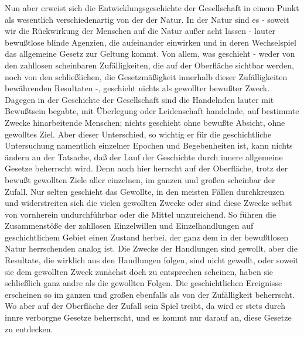 Nun aber erweist sich die Entwicklungsgeschichte der
Gesellschaft in einem Punkt als wesentlich verschiedenartig von der der
Natur. In der Natur sind es - soweit wir die Rückwirkung der Menschen
auf die Natur außer acht lassen - lauter bewußtlose blinde Agenzien, die
aufeinander einwirken und in deren Wechselspiel das allgemeine Gesetz
zur Geltung kommt. Von allem, was geschieht - weder von den zahllosen
scheinbaren Zufälligkeiten, die auf der Oberfläche sichtbar werden, noch
von den schließlichen, die Gesetzmäßigkeit innerhalb dieser
Zufälligkeiten bewährenden Resultaten -, geschieht nichts als gewollter
bewußter Zweck. Dagegen in der Geschichte der Gesellschaft sind die
Handelnden lauter mit Bewußtsein begabte, mit Überlegung oder
Leidenschaft handelnde, auf bestimmte Zwecke hinarbeitende Menschen;
nichts geschieht ohne bewußte Absicht, ohne gewolltes Ziel. Aber dieser
Unterschied, so wichtig er für die geschichtliche Untersuchung
namentlich einzelner Epochen und Begebenheiten ist, kann nichts ändern
an der Tatsache, daß der Lauf der Geschichte durch innere allgemeine
Gesetze beherrscht wird. Denn auch hier herrscht auf der Oberfläche,
trotz der bewußt gewollten Ziele aller einzelnen, im ganzen und großen
scheinbar der Zufall. Nur selten geschieht das Gewollte, in
den \textbar{}meisten Fällen
durchkreuzen und widerstreiten sich die vielen gewollten Zwecke oder
sind diese Zwecke selbst von vornherein undurchführbar oder die Mittel
unzureichend. So führen die Zusammenstöße der zahllosen Einzelwillen und
Einzelhandlungen auf geschichtlichem Gebiet einen Zustand herbei, der
ganz dem in der bewußtlosen Natur herrschenden analog ist. Die Zwecke
der Handlungen sind gewollt, aber die Resultate, die wirklich aus den
Handlungen folgen, sind nicht gewollt, oder soweit sie dem gewollten
Zweck zunächst doch zu entsprechen scheinen, haben sie schließlich ganz
andre als die gewollten Folgen. Die geschichtlichen Ereignisse
erscheinen so im ganzen und großen ebenfalls als von der Zufälligkeit
beherrscht. Wo aber auf der Oberfläche der Zufall sein Spiel treibt, da
wird er stets durch innre verborgne Gesetze beherrscht, und es kommt nur
darauf an, diese Gesetze zu entdecken.

